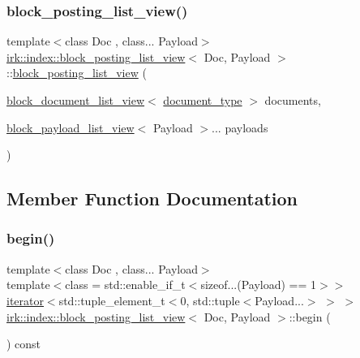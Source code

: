 \subsubsection{\texorpdfstring{block\+\_\+posting\+\_\+list\+\_\+view()}{block\_posting\_list\_view()}}
{\footnotesize\ttfamily template$<$class Doc , class... Payload$>$ \\
\mbox{\hyperlink{classirk_1_1index_1_1block__posting__list__view}{irk\+::index\+::block\+\_\+posting\+\_\+list\+\_\+view}}$<$ Doc, Payload $>$\+::\mbox{\hyperlink{classirk_1_1index_1_1block__posting__list__view}{block\+\_\+posting\+\_\+list\+\_\+view}} (\begin{DoxyParamCaption}\item[{\mbox{\hyperlink{classirk_1_1index_1_1block__document__list__view}{block\+\_\+document\+\_\+list\+\_\+view}}$<$ \mbox{\hyperlink{classirk_1_1index_1_1block__posting__list__view_a4a778116d22c9cf347f38da132ca0900}{document\+\_\+type}} $>$}]{documents,  }\item[{\mbox{\hyperlink{classirk_1_1index_1_1block__payload__list__view}{block\+\_\+payload\+\_\+list\+\_\+view}}$<$ Payload $>$...}]{payloads }\end{DoxyParamCaption})\hspace{0.3cm}{\ttfamily [inline]}}



\subsection{Member Function Documentation}
\mbox{\label{classirk_1_1index_1_1block__posting__list__view_a47c5ede6a59868de82629e8cab826cf0}} 
\subsubsection{\texorpdfstring{begin()}{begin()}\hspace{0.1cm}{\footnotesize\ttfamily [1/2]}}
{\footnotesize\ttfamily template$<$class Doc , class... Payload$>$ \\
template$<$class  = std\+::enable\+\_\+if\+\_\+t$<$sizeof...(\+Payload) == 1$>$$>$ \\
\mbox{\hyperlink{classirk_1_1index_1_1block__posting__list__view_1_1iterator}{iterator}}$<$std\+::tuple\+\_\+element\+\_\+t$<$0, std\+::tuple$<$Payload...$>$ $>$ $>$ \mbox{\hyperlink{classirk_1_1index_1_1block__posting__list__view}{irk\+::index\+::block\+\_\+posting\+\_\+list\+\_\+view}}$<$ Doc, Payload $>$\+::begin (\begin{DoxyParamCaption}{ }\end{DoxyParamCaption}) const\hspace{0.3cm}{\ttfamily [inline]}}

